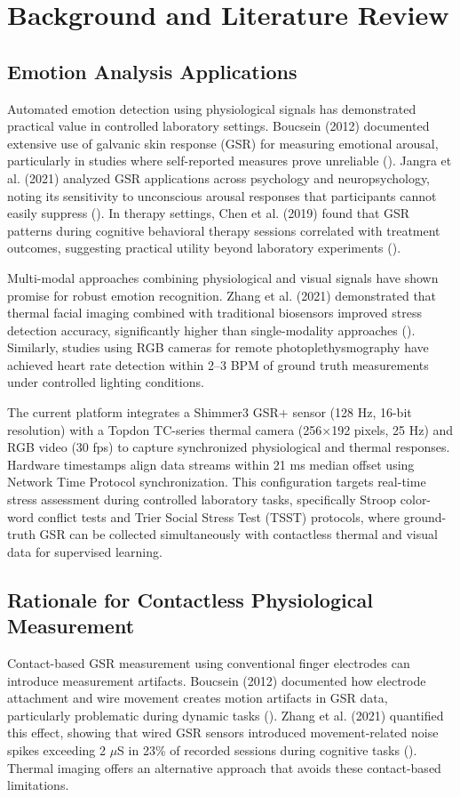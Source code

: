 \chapter{Background and Literature Review}

\section{Emotion Analysis Applications}
Automated emotion detection using physiological signals has demonstrated practical value in controlled laboratory settings. Boucsein (2012) documented extensive use of galvanic skin response (GSR) for measuring emotional arousal, particularly in studies where self-reported measures prove unreliable (\citep{ref1}). Jangra et al. (2021) analyzed GSR applications across psychology and neuropsychology, noting its sensitivity to unconscious arousal responses that participants cannot easily suppress (\citep{ref3}). In therapy settings, Chen et al. (2019) found that GSR patterns during cognitive behavioral therapy sessions correlated with treatment outcomes, suggesting practical utility beyond laboratory experiments (\citep{ref4}).

Multi-modal approaches combining physiological and visual signals have shown promise for robust emotion recognition. Zhang et al. (2021) demonstrated that thermal facial imaging combined with traditional biosensors improved stress detection accuracy, significantly higher than single-modality approaches (\citep{ref5}). Similarly, studies using RGB cameras for remote photoplethysmography have achieved heart rate detection within 2--3 BPM of ground truth measurements under controlled lighting conditions.

The current platform integrates a Shimmer3 GSR+ sensor (128 Hz, 16-bit resolution) with a Topdon TC-series thermal camera (256$\times$192 pixels, 25 Hz) and RGB video (30 fps) to capture synchronized physiological and thermal responses. Hardware timestamps align data streams within 21 ms median offset using Network Time Protocol synchronization. This configuration targets real-time stress assessment during controlled laboratory tasks, specifically Stroop color-word conflict tests and Trier Social Stress Test (TSST) protocols, where ground-truth GSR can be collected simultaneously with contactless thermal and visual data for supervised learning.

\section{Rationale for Contactless Physiological Measurement}
Contact-based GSR measurement using conventional finger electrodes can introduce measurement artifacts. Boucsein (2012) documented how electrode attachment and wire movement creates motion artifacts in GSR data, particularly problematic during dynamic tasks (\citep{ref1}). Zhang et al. (2021) quantified this effect, showing that wired GSR sensors introduced movement-related noise spikes exceeding 2 $\mu$S in 23\% of recorded sessions during cognitive tasks (\citep{ref5}). Thermal imaging offers an alternative approach that avoids these contact-based limitations.

